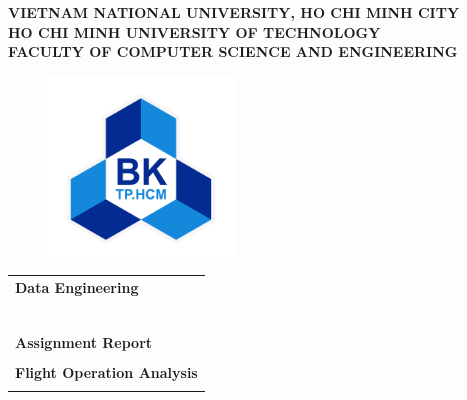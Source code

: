 \documentclass[12pt, a4paper]{article}
\begin{document}
\begin{titlepage}

    \begin{center}
        \large \textbf{VIETNAM NATIONAL UNIVERSITY, HO CHI MINH CITY} \\
        \large \textbf{HO CHI MINH UNIVERSITY OF TECHNOLOGY} \\
        \large \textbf{FACULTY OF COMPUTER SCIENCE AND ENGINEERING}
    \end{center}

    \begin{figure}[h!]
        \begin{center}
            \includegraphics[width=5cm]{Images/hcmut.png}
        \end{center}
    \end{figure}

    \begin{center}
        \begin{tabular}{c}
        \multicolumn{1}{l}{\textbf{{\Large Data Engineering}}}\\
        ~~\\
        \hline
        \\
        \multicolumn{1}{l}{\textbf{{\Large Assignment Report}}}\\
        \\
        \textbf{{\Huge Flight Operation Analysis}}\\
        \\
        \hline
        \end{tabular}
        \end{center}


\end{titlepage}
\end{document}

